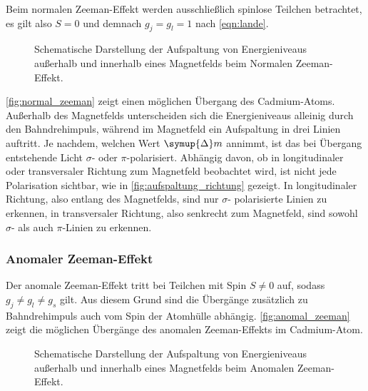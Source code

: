     Beim normalen Zeeman-Effekt werden ausschließlich spinlose Teilchen betrachtet,
    es gilt also $S = 0$ und demnach $g_j = g_l = 1$ nach \autoref{eqn:lande}.
    \begin{figure}[H]
      \centering
        \resizebox{0.5\textwidth}{!}{
            
        }
       \caption{Schematische Darstellung der Aufspaltung von Energieniveaus außerhalb und innerhalb eines Magnetfelds beim Normalen Zeeman-Effekt.}
       \label{fig:normal_zeeman}
    \end{figure}
    \autoref{fig:normal_zeeman} zeigt einen möglichen Übergang des Cadmium-Atoms.
    Außerhalb des Magnetfelds unterscheiden sich die Energieniveaus alleinig durch den Bahndrehimpuls,
    während im Magnetfeld ein Aufspaltung in drei Linien auftritt.
    Je nachdem,
    welchen Wert $\symup{\Delta} m$ annimmt,
    ist das bei Übergang entstehende Licht $\sigma$- oder $\pi$-polarisiert.
    Abhängig davon,
    ob in longitudinaler oder transversaler Richtung zum Magnetfeld beobachtet wird,
    ist nicht jede Polarisation sichtbar,
    wie in \autoref{fig:aufspaltung_richtung} gezeigt.
    In longitudinaler Richtung,
    also entlang des Magnetfelds,
    sind nur $\sigma$- polarisierte Linien zu erkennen,
    in transversaler Richtung,
    also senkrecht zum Magnetfeld,
    sind sowohl $\sigma$- als auch $\pi$-Linien zu erkennen.


\subsubsection{Anomaler Zeeman-Effekt}

    Der anomale Zeeman-Effekt tritt bei Teilchen mit Spin $S \neq 0$ auf,
    sodass $g_j \neq g_l \neq g_s$ gilt.
    Aus diesem Grund sind die Übergänge zusätzlich zu Bahndrehimpuls auch vom Spin der Atomhülle abhängig.
    \autoref{fig:anomal_zeeman} zeigt die möglichen Übergänge des anomalen Zeeman-Effekts im Cadmium-Atom.
    \begin{figure}[H]
      \centering
        \resizebox{0.5\textwidth}{!}{
            
        }
       \caption{Schematische Darstellung der Aufspaltung von Energieniveaus außerhalb und innerhalb eines Magnetfelds beim Anomalen Zeeman-Effekt.}
       \label{fig:anomal_zeeman}
    \end{figure}


